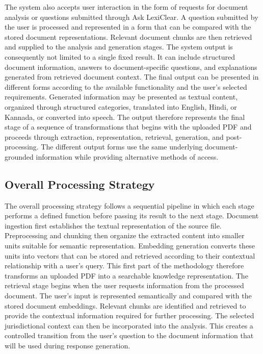 \documentclass[12pt,a4paper,oneside]{report}
\begin{document}
The system also accepts user interaction in the form of requests for
document analysis or questions submitted through Ask LexiClear. A question
submitted by the user is processed and represented in a form that can be
compared with the stored document representations. Relevant document chunks
are then retrieved and supplied to the analysis and generation stages. The
system output is consequently not limited to a single fixed result. It can
include structured document information, answers to document-specific
questions, and explanations generated from retrieved document context. The final output can be presented in different forms according to the
available functionality and the user's selected requirements. Generated
information may be presented as textual content, organized through
structured categories, translated into English, Hindi, or Kannada, or
converted into speech. The output therefore represents the final stage of a
sequence of transformations that begins with the uploaded PDF and proceeds
through extraction, representation, retrieval, generation, and
post-processing. The different output forms use the same underlying
document-grounded information while providing alternative methods of access.

\subsection{Overall Processing Strategy}

The overall processing strategy follows a sequential pipeline in which each
stage performs a defined function before passing its result to the next
stage. Document ingestion first establishes the textual representation of
the source file. Preprocessing and chunking then organize the extracted
content into smaller units suitable for semantic representation. Embedding
generation converts these units into vectors that can be stored and
retrieved according to their contextual relationship with a user's query.
This first part of the methodology therefore transforms an uploaded PDF
into a searchable knowledge representation. The retrieval stage begins when the user requests information from the
processed document. The user's input is represented semantically and
compared with the stored document embeddings. Relevant chunks are identified
and retrieved to provide the contextual information required for further
processing. The selected jurisdictional context can then be incorporated
into the analysis. This creates a controlled transition from the user's
question to the document information that will be used during response
generation. 
\end{document}
